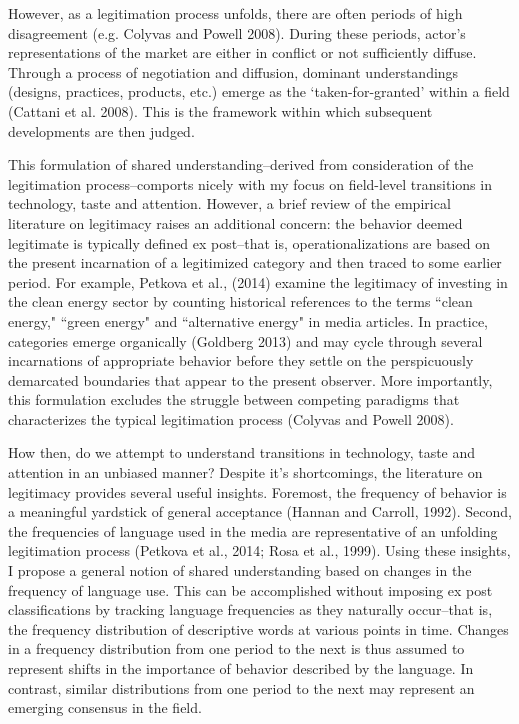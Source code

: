 However, as a legitimation process unfolds, there are often periods of high disagreement (e.g. Colyvas and Powell 2008). During these periods, actor's representations of the market are either in conflict or not sufficiently diffuse. Through a process of negotiation and diffusion, dominant understandings (designs, practices, products, etc.) emerge as the `taken-for-granted' within a field (Cattani et al. 2008). This is the framework within which subsequent developments are then judged.

This formulation of shared understanding--derived from consideration of the legitimation process--comports nicely with my focus on field-level transitions in technology, taste and attention. However, a brief review of the empirical literature on legitimacy raises an additional concern: the behavior deemed legitimate is typically defined ex post--that is, operationalizations are based on the present incarnation of a legitimized category and then traced to some earlier period. For example, Petkova et al., (2014) examine the legitimacy of investing in the clean energy sector by counting historical references to the terms ``clean energy," ``green energy" and ``alternative energy" in media articles. In practice, categories emerge organically (Goldberg 2013) and may cycle through several incarnations of appropriate behavior before they settle on the perspicuously demarcated boundaries that appear to the present observer. More importantly, this formulation excludes the struggle between competing paradigms that characterizes the typical legitimation process (Colyvas and Powell 2008).

How then, do we attempt to understand transitions in technology, taste and attention in an unbiased manner? Despite it's shortcomings, the literature on legitimacy provides several useful insights. Foremost, the frequency of  behavior is a meaningful yardstick of general acceptance (Hannan and Carroll, 1992). Second, the frequencies of language used in the media are representative of an unfolding legitimation process (Petkova et al., 2014; Rosa et al., 1999). Using these insights, I propose a general notion of shared understanding based on changes in the frequency of language use. This can be accomplished without imposing ex post classifications by tracking language frequencies as they naturally occur--that is, the frequency distribution of descriptive words at various points in time. Changes in a frequency distribution from one period to the next is thus assumed to represent shifts in the importance of behavior described by the language. In contrast, similar distributions from one period to the next may represent an emerging consensus in the field. 


